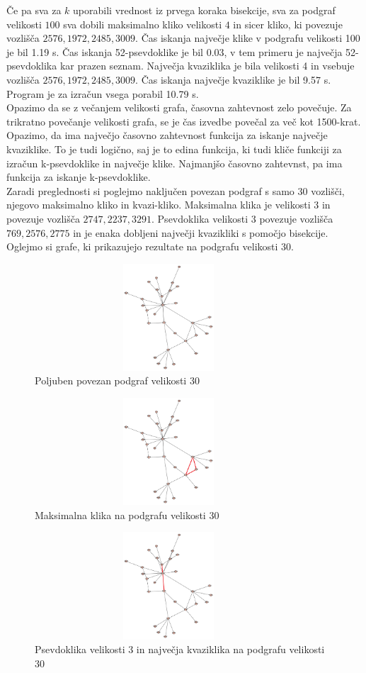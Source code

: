 \documentclass[12pt,a4paper]{amsart}
\theoremstyle{definition}
\theoremstyle{plain}
\begin{document}
Če pa sva za $k$ uporabili vrednost iz prvega koraka bisekcije, sva za podgraf velikosti $100$ sva dobili maksimalno kliko velikosti $4$ in sicer kliko, ki povezuje vozlišča $2576, 1972, 2485, 3009$. Čas iskanja največje klike v podgrafu velikosti 100 je bil 1.19 s. Čas iskanja 52-psevdoklike je bil 0.03, v tem primeru je največja 52-psevdoklika kar prazen seznam. Največja kvaziklika je bila velikosti 4 in vsebuje vozlišča $2576, 1972, 2485, 3009$. Čas iskanja največje kvaziklike je bil 9.57 s. Program je za izračun vsega porabil 10.79 s. 
\\

Opazimo da se z večanjem velikosti grafa, časovna zahtevnost zelo povečuje. Za trikratno povečanje velikosti grafa, se je čas izvedbe povečal za več kot 1500-krat. Opazimo, da ima največjo časovno zahtevnost funkcija za iskanje največje kvaziklike. To je tudi logično, saj je to edina funkcija, ki tudi kliče funkciji za izračun k-psevdoklike in največje klike. Najmanjšo časovno zahtevnst, pa ima funkcija za iskanje k-psevdoklike. \\

Zaradi preglednosti si poglejmo naključen povezan podgraf s samo $30$ vozlišči, njegovo maksimalno kliko in kvazi-kliko.
Maksimalna klika je velikosti $3$ in povezuje vozlišča $2747, 2237, 3291$. Psevdoklika velikosti 3 povezuje vozlišča $769, 2576, 2775$ in je enaka dobljeni največji kvazikliki s pomočjo bisekcije. Oglejmo si grafe, ki prikazujejo rezultate na podgrafu velikosti 30.\\

\begin{figure}[h]
\caption{Poljuben povezan podgraf velikosti 30}
\centering
\includegraphics[width=10cm, height=4cm]{klika}
\end{figure}

\begin{figure}[h]
\caption{Maksimalna klika na podgrafu velikosti 30}
\centering
\includegraphics[width=10cm, height=4cm]{max_klika}
\end{figure}

\begin{figure}[h]
\caption{Psevdoklika velikosti 3 in največja kvaziklika na podgrafu velikosti 30}
\centering
\includegraphics[width=10cm, height=4cm]{psevdoklika}
\end{figure}
\end{document}
